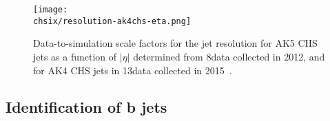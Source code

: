 
\begin{figure}[!htb]
\begin{center}
\texttt{[image: \\chsix/resolution-ak4chs-eta.png]}
\end{center} 
\caption{Data-to-simulation scale factors for the jet \pt resolution for AK5 CHS jets as a function of $|\eta|$ determined from 8\TeV data collected in 2012, and for AK4 CHS jets in 13\TeV data collected in 2015~\cite{CMS-DP-2016-020}.}
\label{fig:resolcorr813TeV}
\end{figure}

\subsection{Identification of b jets}\label{subsec:bjets}

